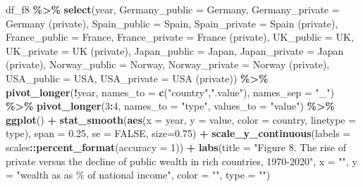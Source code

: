\documentclass[
  xelatex, ja=standard]{bxjsbook}
\newenvironment{Shaded}{\begin{snugshade}}{\end{snugshade}}
\newcommand{\AttributeTok}[1]{\textcolor[rgb]{0.13,0.29,0.53}{#1}}
\newcommand{\ConstantTok}[1]{\textcolor[rgb]{0.56,0.35,0.01}{#1}}
\newcommand{\DecValTok}[1]{\textcolor[rgb]{0.00,0.00,0.81}{#1}}
\newcommand{\FloatTok}[1]{\textcolor[rgb]{0.00,0.00,0.81}{#1}}
\newcommand{\FunctionTok}[1]{\textcolor[rgb]{0.13,0.29,0.53}{\textbf{#1}}}
\newcommand{\NormalTok}[1]{#1}
\newcommand{\SpecialCharTok}[1]{\textcolor[rgb]{0.81,0.36,0.00}{\textbf{#1}}}
\newcommand{\StringTok}[1]{\textcolor[rgb]{0.31,0.60,0.02}{#1}}
\theoremstyle{definition}
\theoremstyle{definition}
\theoremstyle{definition}
\theoremstyle{definition}
\theoremstyle{remark}
\begin{document}
\begin{Shaded}
\begin{Highlighting}[]
\NormalTok{df\_f8 }\SpecialCharTok{\%\textgreater{}\%} 
  \FunctionTok{select}\NormalTok{(year, }\AttributeTok{Germany\_public =}\NormalTok{ Germany, }\AttributeTok{Germany\_private =} \StringTok{\textquotesingle{}Germany (private)\textquotesingle{}}\NormalTok{, }
         \AttributeTok{Spain\_public =}\NormalTok{ Spain, }\AttributeTok{Spain\_private =} \StringTok{\textquotesingle{}Spain (private)\textquotesingle{}}\NormalTok{, }
         \AttributeTok{France\_public =}\NormalTok{ France, }\AttributeTok{France\_private =} \StringTok{\textquotesingle{}France (private)\textquotesingle{}}\NormalTok{, }
         \AttributeTok{UK\_public  =}\NormalTok{ UK, }\AttributeTok{UK\_private =} \StringTok{\textquotesingle{}UK (private)\textquotesingle{}}\NormalTok{, }
         \AttributeTok{Japan\_public =}\NormalTok{ Japan, }\AttributeTok{Japan\_private =} \StringTok{\textquotesingle{}Japan (private)\textquotesingle{}}\NormalTok{, }
         \AttributeTok{Norway\_public =}\NormalTok{ Norway, }\AttributeTok{Norway\_private =} \StringTok{\textquotesingle{}Norway (private)\textquotesingle{}}\NormalTok{,}
         \AttributeTok{USA\_public =}\NormalTok{ USA, }\AttributeTok{USA\_private =} \StringTok{\textquotesingle{}USA (private)\textquotesingle{}}\NormalTok{) }\SpecialCharTok{\%\textgreater{}\%}
  \FunctionTok{pivot\_longer}\NormalTok{(}\SpecialCharTok{!}\NormalTok{year, }\AttributeTok{names\_to =} \FunctionTok{c}\NormalTok{(}\StringTok{"country"}\NormalTok{,}\StringTok{".value"}\NormalTok{), }\AttributeTok{names\_sep =} \StringTok{"\_"}\NormalTok{) }\SpecialCharTok{\%\textgreater{}\%}
  \FunctionTok{pivot\_longer}\NormalTok{(}\DecValTok{3}\SpecialCharTok{:}\DecValTok{4}\NormalTok{, }\AttributeTok{names\_to =} \StringTok{"type"}\NormalTok{, }\AttributeTok{values\_to =} \StringTok{"value"}\NormalTok{) }\SpecialCharTok{\%\textgreater{}\%}
  \FunctionTok{ggplot}\NormalTok{() }\SpecialCharTok{+}
  \FunctionTok{stat\_smooth}\NormalTok{(}\FunctionTok{aes}\NormalTok{(}\AttributeTok{x =}\NormalTok{ year, }\AttributeTok{y =}\NormalTok{ value, }\AttributeTok{color =}\NormalTok{ country, }\AttributeTok{linetype =}\NormalTok{ type), }
              \AttributeTok{span =} \FloatTok{0.25}\NormalTok{, }\AttributeTok{se =} \ConstantTok{FALSE}\NormalTok{, }\AttributeTok{size=}\FloatTok{0.75}\NormalTok{) }\SpecialCharTok{+}
  \FunctionTok{scale\_y\_continuous}\NormalTok{(}\AttributeTok{labels =}\NormalTok{ scales}\SpecialCharTok{::}\FunctionTok{percent\_format}\NormalTok{(}\AttributeTok{accuracy =} \DecValTok{1}\NormalTok{)) }\SpecialCharTok{+}
  \FunctionTok{labs}\NormalTok{(}\AttributeTok{title =} \StringTok{"Figure 8. The rise of private versus the decline of public }
\StringTok{       wealth in rich countries, 1970{-}2020"}\NormalTok{, }
       \AttributeTok{x =} \StringTok{""}\NormalTok{, }\AttributeTok{y =} \StringTok{"wealth as as \% of national income"}\NormalTok{, }\AttributeTok{color =} \StringTok{""}\NormalTok{, }\AttributeTok{type =} \StringTok{""}\NormalTok{)}
\end{Highlighting}
\end{Shaded}
\end{document}

